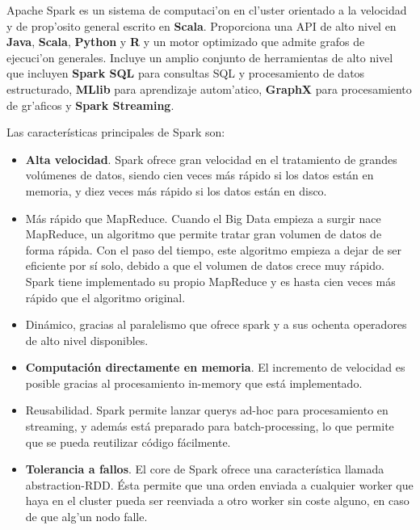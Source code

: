 

Apache Spark es un sistema de computaci'on en cl'uster orientado a la velocidad y de prop'osito general escrito en \textbf{Scala}. Proporciona una API de alto nivel en \textbf{Java}, \textbf{Scala}, \textbf{Python} y \textbf{R} y un motor optimizado que admite grafos de ejecuci'on generales. Incluye un amplio conjunto de herramientas de alto nivel que incluyen \textbf{Spark SQL} para consultas SQL y procesamiento de datos estructurado, \textbf{MLlib} para aprendizaje autom'atico, \textbf{GraphX} para procesamiento de gr'aficos y \textbf{Spark Streaming}.\cite{spark1}

Las características principales de Spark son: 
\begin{itemize}
\item \textbf{Alta velocidad}. Spark ofrece gran velocidad en el tratamiento de grandes volúmenes de datos, siendo cien veces más rápido si los datos están en memoria, y diez veces más rápido si los datos están en disco. 

\item Más rápido que MapReduce. Cuando el Big Data empieza a surgir nace MapReduce, un algoritmo que permite tratar gran volumen de datos de forma rápida. Con el paso del tiempo, este algoritmo empieza a dejar de ser eficiente por sí solo, debido a que el volumen de datos crece muy rápido. Spark tiene implementado su propio MapReduce y es hasta cien veces más rápido que el algoritmo original.

\item Dinámico, gracias al paralelismo que ofrece spark y a sus ochenta operadores de alto nivel disponibles.

\item \textbf{Computación directamente en memoria}. El incremento de velocidad es posible gracias al procesamiento in-memory que está implementado.

\item Reusabilidad. Spark permite lanzar querys ad-hoc para procesamiento en streaming, y además está preparado para batch-processing, lo que permite que se pueda reutilizar código fácilmente.

\item \textbf{Tolerancia a fallos}. El core de Spark ofrece una característica llamada abstraction-RDD. Ésta permite que una orden enviada a cualquier worker que haya en el cluster pueda ser reenviada a otro worker sin coste alguno, en caso de que alg'un nodo falle.  


\end{itemize}
